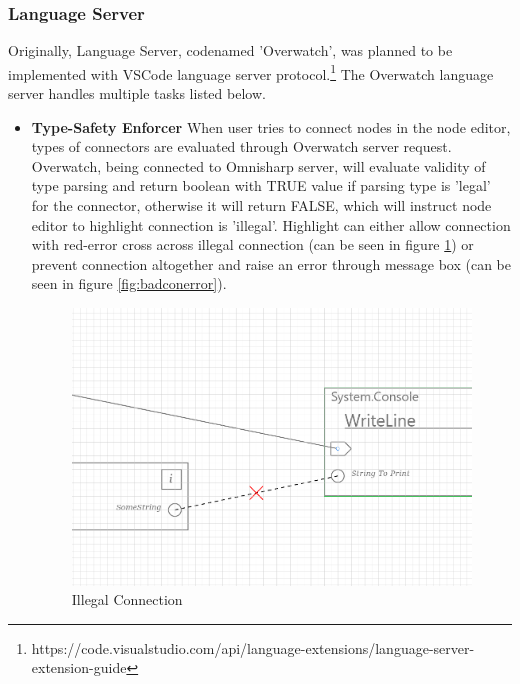 \documentclass{article}
\begin{document}
\subsubsection{Language Server}
Originally, Language Server, codenamed 'Overwatch', was planned to be implemented with VSCode language server protocol.\footnote{https://code.visualstudio.com/api/language-extensions/language-server-extension-guide}
The Overwatch language server handles multiple tasks listed below.
\begin{itemize}
    \item \textbf{Type-Safety Enforcer} \newline
          When user tries to connect nodes in the node editor, types of connectors are evaluated through Overwatch server request. Overwatch, being connected to Omnisharp server, will evaluate validity of type parsing and return boolean with TRUE value if parsing type is 'legal' for the connector, otherwise it will return FALSE, which will instruct node editor to highlight connection is 'illegal'. Highlight can either allow connection with red-error cross across illegal connection (can be seen in figure \ref{fig:badcon}) or prevent connection altogether and raise an error through message box (can be seen in figure \ref{fig:badconerror}).
          \begin{figure}[H]
              \centering
              \includegraphics[width=1\textwidth]{illegalmove_cross.PNG}
              \caption{Illegal Connection}
              \label{fig:badcon}
          \end{figure}
          \begin{figure}[H]
              \centering

\end{figure}
\end{itemize}
\end{document}
